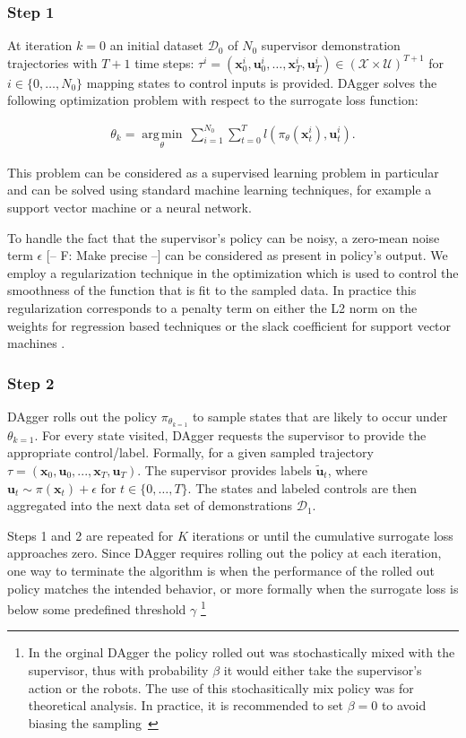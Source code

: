 \documentclass[10pt, conference]{ieeeconf}      %
\DeclareMathOperator*{\argmin}{arg\,min}
\newcommand{\bu}{\mathbf{u}}
\newcommand{\bx}{\mathbf{x}}
\begin{document}
\subsubsection{Step 1}
At iteration $k=0$ an initial dataset $\mathcal{D}_0$ of $N_0$ supervisor demonstration trajectories 
with $T+1$ time steps: $\tau^i=(\bx_0^i, \bu_0^i, \ldots, \bx_T^i, \bu_T^i)\in (\mathcal{X}\times\mathcal{U})^{T+1}$ for $i\in \{0, \ldots, N_0\}$
mapping states to control
inputs is provided. DAgger solves the following optimization problem with respect to the surrogate loss function:

 \vspace{-2ex}
\begin{align}\label{eq:super_objj}
\theta_{k} = \underset{\theta}{\argmin} \: \sum_{i=1}^{N_0}\sum_{t=0}^T l(\pi_{\theta}(\bx_t^{i}),\bu_{t}^i).
\end{align}

This problem can be considered as a supervised learning problem in particular and can be solved using standard machine
learning techniques, for example a support vector machine or a neural network. 
 
To handle the fact that the supervisor's policy can be noisy, a zero-mean noise term $\epsilon$ 
{ \color{blue} [-- F: Make precise --]}
can be considered as present in policy's output. We employ a regularization technique in the optimization which is
used to control the smoothness of the function that is fit to the sampled data. In practice this regularization corresponds to a penalty term on either the L2 norm on the weights for regression based techniques or the slack coefficient for support vector machines \cite{scholkopf2002learning}.
 
 \subsubsection{Step 2}
DAgger rolls out the policy $\pi_{\theta_{k=1}}$ to sample states that are likely to occur under $\theta_{k=1}$. For every state visited, DAgger requests the supervisor to provide the appropriate control/label. Formally, for a given sampled trajectory  $\tau = (\bx_0,\bu_0,...,\bx_T,\bu_T )$. The supervisor provides labels $\tilde{\bu}_t$, where $\bu_t \sim \pi(\bx_t) + \epsilon$ for $t\in \{0, \ldots, T\}$.
The states and labeled controls are then aggregated into the next data set of demonstrations $\mathcal{D}_1$. 

Steps 1 and 2 are repeated for $K$ iterations or until the cumulative surrogate loss approaches zero. Since DAgger
requires rolling out the policy at each iteration, one way to terminate the algorithm is when the performance of the
rolled out policy matches the intended behavior, or more formally when the surrogate loss is below some predefined
threshold $\gamma$ \footnote{In the orginal DAgger the policy rolled out was stochastically mixed with the supervisor, thus with probability $\beta$ it would either take the supervisor's action or the robots. The use of this stochasitically mix policy was for theoretical analysis. In practice, it is recommended to set $\beta = 0$ to avoid biasing the sampling~\cite{NIPS2014_5421,ross2010reduction}}
\end{document}

